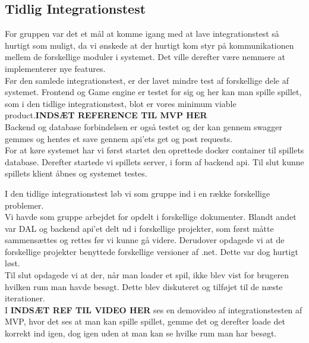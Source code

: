 \subsection{Tidlig Integrationstest}
For gruppen var det et mål at komme igang med at lave integrationstest så hurtigt som muligt, da vi ønskede at der hurtigt kom styr på kommunikationen mellem de forskellige moduler i systemet. Det ville derefter være nemmere at implementerer nye features.\\

Før den samlede integrationstest, er der lavet mindre test af forskellige dele af systemet.
Frontend og Game engine er testet for sig og her kan man spille spillet, som i den tidlige integrationstest, blot er vores minimum viable product.\textbf{INDSÆT REFERENCE TIL MVP HER}\\

Backend og database forbindelsen er også testet og der kan gennem swagger gemmes og hentes et save gennem api'ets get og post requests.\\

For at køre systemet har vi først startet den oprettede docker container til spillets database. Derefter startede vi spillets server, i form af backend api. Til slut kunne spillets klient åbnes og systemet testes.

I den tidlige integrationstest løb vi som gruppe ind i en række forskellige problemer.\\
Vi havde som gruppe arbejdet for opdelt i forskellige dokumenter. Blandt andet var DAL og backend api'et delt ud i forskellige projekter, som først måtte sammensættes og rettes før vi kunne gå videre.
Derudover opdagede vi at de forskellige projekter benyttede forskellige versioner af .net. Dette var dog hurtigt løst.\\
Til slut opdagede vi at der, når man loader et spil, ikke blev vist for brugeren hvilken rum man havde besøgt. Dette blev diskuteret og tilføjet til de næste iterationer.\\

I \textbf{INDSÆT REF TIL VIDEO HER} ses en demovideo af integrationstesten af MVP, hvor det ses at man kan spille spillet, gemme det og derefter loade det korrekt ind igen, dog igen uden at man kan se hvilke rum man har besøgt.

